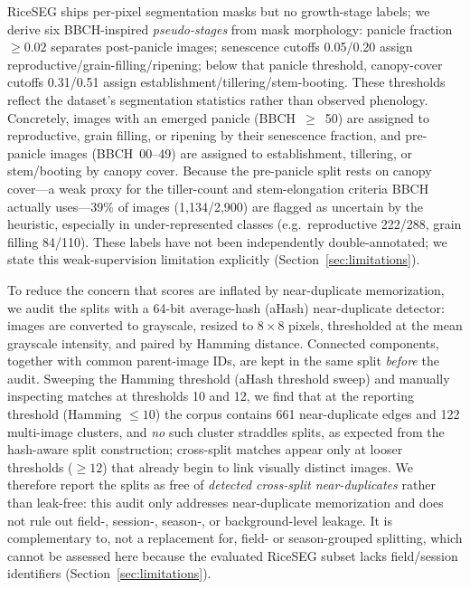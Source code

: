 \documentclass[conference,a4paper]{IEEEtran}
\begin{document}
RiceSEG ships per-pixel segmentation masks but no growth-stage labels; we derive six BBCH-inspired \emph{pseudo-stages} from mask morphology: panicle fraction $\geq0.02$ separates post-panicle images; senescence cutoffs 0.05/0.20 assign reproductive/grain-filling/ripening; below that panicle threshold, canopy-cover cutoffs 0.31/0.51 assign establishment/tillering/stem-booting. These thresholds reflect the dataset's segmentation statistics rather than observed phenology. Concretely, images with an emerged panicle (BBCH~$\ge$~50) are assigned to reproductive, grain filling, or ripening by their senescence fraction, and pre-panicle images (BBCH~00--49) are assigned to establishment, tillering, or stem/booting by canopy cover. Because the pre-panicle split rests on canopy cover---a weak proxy for the tiller-count and stem-elongation criteria BBCH actually uses---39\% of images (1{,}134/2{,}900) are flagged as uncertain by the heuristic, especially in under-represented classes (e.g.\ reproductive 222/288, grain filling 84/110). These labels have not been independently double-annotated; we state this weak-supervision limitation explicitly (Section~\ref{sec:limitations}).

To reduce the concern that scores are inflated by near-duplicate memorization, we audit the splits with a 64-bit average-hash (aHash) near-duplicate detector: images are converted to grayscale, resized to $8\times8$ pixels, thresholded at the mean grayscale intensity, and paired by Hamming distance. Connected components, together with common parent-image IDs, are kept in the same split \emph{before} the audit. Sweeping the Hamming threshold (aHash threshold sweep) and manually inspecting matches at thresholds 10 and 12, we find that at the reporting threshold (Hamming $\le 10$) the corpus contains 661 near-duplicate edges and 122 multi-image clusters, and \emph{no} such cluster straddles splits, as expected from the hash-aware split construction; cross-split matches appear only at looser thresholds ($\ge 12$) that already begin to link visually distinct images. We therefore report the splits as free of \emph{detected cross-split near-duplicates} rather than leak-free: this audit only addresses near-duplicate memorization and does not rule out field-, session-, season-, or background-level leakage. It is complementary to, not a replacement for, field- or season-grouped splitting, which cannot be assessed here because the evaluated RiceSEG subset lacks field/session identifiers (Section~\ref{sec:limitations}).


\end{document}
